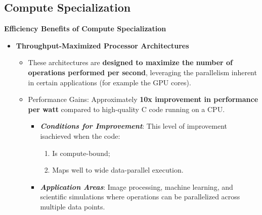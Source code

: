 \subsection{Compute Specialization}

\begin{flushleft}
    \textcolor{Green3}{ \textbf{Efficiency Benefits of Compute Specialization}}
\end{flushleft}
\begin{itemize}[label=\textcolor{Green3}{}]
    \item \textcolor{Green3}{\textbf{Throughput-Maximized Processor Architectures}}
    \begin{itemize}
        \item[\textcolor{Green3}{\faIcon{book}}] These architectures are \textbf{designed to maximize the number of operations performed per second}, leveraging the parallelism inherent in certain applications (for example the GPU cores).
        \item[\textcolor{Green3}{\faIcon{tachometer-alt}}] Performance Gains: Approximately \textbf{10x improvement in performance per watt} compared to high-quality C code running on a CPU.
        \begin{itemize}
            \item \textbf{\emph{Conditions for Improvement}}: This level of improvement is\break achieved when the code:
            \begin{enumerate}
                \item Is compute-bound;
                \item Maps well to wide data-parallel execution.
            \end{enumerate}
            \item \textbf{\emph{Application Areas}}: Image processing, machine learning, and scientific simulations where operations can be parallelized across multiple data points.
        \end{itemize}
    \end{itemize}


\end{itemize}
